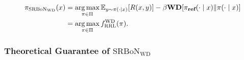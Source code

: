 \begin{equation}
    \begin{aligned}
     \pi_{\mathrm{SRBoN}_\mathrm{WD}}(x)
          &= \operatorname*{arg\,max}_{\pi \in \Pi} \mathbb{E}_{y \sim \pi(\cdot \mid x)}[R(x,y)]  -\beta \textbf{WD} [\pi_{\textbf{ref}} (\cdot \mid x) \| \pi (\cdot \mid x)]\\
     &= \operatorname*{arg\,max}_{\pi \in \Pi} f_\mathrm{RRL}^{\mathrm{WD}}(\pi).
     \label{eq:srbonwd}
     \end{aligned}
\end{equation}


\subsubsection{Theoretical Guarantee of $\mathrm{SRBoN}_{\mathrm{WD}}$}\label{sec:WD}

